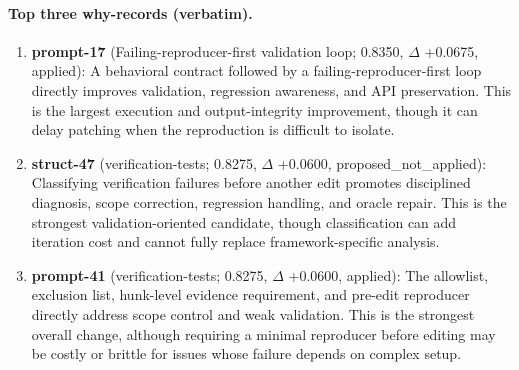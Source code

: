 \paragraph{Top three why-records (verbatim).}\begin{enumerate}\itemsep1pt
\item \textbf{prompt-17} (Failing-reproducer-first validation loop; 0.8350, $\Delta$ +0.0675, applied): A behavioral contract followed by a failing-reproducer-first loop directly improves validation, regression awareness, and API preservation. This is the largest execution and output-integrity improvement, though it can delay patching when the reproduction is difficult to isolate.
\item \textbf{struct-47} (verification-tests; 0.8275, $\Delta$ +0.0600, proposed\_not\_applied): Classifying verification failures before another edit promotes disciplined diagnosis, scope correction, regression handling, and oracle repair. This is the strongest validation-oriented candidate, though classification can add iteration cost and cannot fully replace framework-specific analysis.
\item \textbf{prompt-41} (verification-tests; 0.8275, $\Delta$ +0.0600, applied): The allowlist, exclusion list, hunk-level evidence requirement, and pre-edit reproducer directly address scope control and weak validation. This is the strongest overall change, although requiring a minimal reproducer before editing may be costly or brittle for issues whose failure depends on complex setup.
\end{enumerate}
